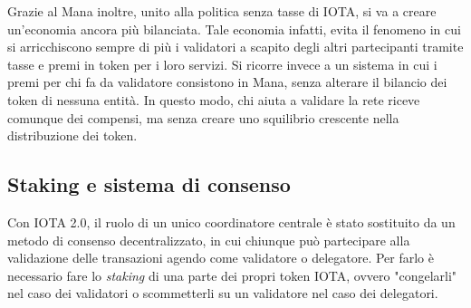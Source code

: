 \documentclass[12pt,a4paper,openright,twoside]{report}
\begin{document}
Grazie al Mana inoltre, unito alla politica senza tasse di IOTA, si va a creare un'economia ancora più bilanciata. Tale economia infatti, evita il fenomeno in cui si arricchiscono sempre di più i validatori a scapito degli altri partecipanti tramite tasse e premi in token per i loro servizi. Si ricorre invece a un sistema in cui i premi per chi fa da validatore consistono in Mana, senza alterare il bilancio dei token di nessuna entità. In questo modo, chi aiuta a validare la rete riceve comunque dei compensi, ma senza creare uno squilibrio crescente nella distribuzione dei token.
\subsection{Staking e sistema di consenso}
\label{coordicide}
Con IOTA 2.0, il ruolo di un unico coordinatore centrale è stato sostituito da un metodo di consenso decentralizzato, in cui chiunque può partecipare alla validazione delle transazioni agendo come validatore o delegatore. Per farlo è necessario fare lo \textit{staking} di una parte dei propri token IOTA, ovvero "congelarli" nel caso dei validatori o scommetterli su un validatore nel caso dei delegatori.
\end{document}
